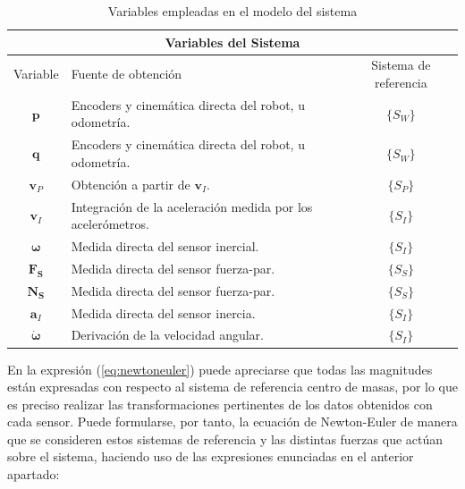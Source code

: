 \begin{table}
\centering
\begin{tabular}[c]{ c p{7.5cm} c }
\hline
\multicolumn{3}{c}{Variables del Sistema} \\
\hline
Variable & Fuente de obtención & Sistema de referencia \\
\hline
$\boldsymbol{p}$ & Encoders y cinemática directa del robot, u odometría\footnotemark[1]. & $\{S_W\}$ \\
$\boldsymbol{q}$ & Encoders y cinemática directa del robot, u odometría\footnotemark[1]. & $\{S_W\}$ \\
$\boldsymbol{v}_P$ & Obtención a partir de $\boldsymbol{v}_I$. & $\{S_P\}$ \\
$\boldsymbol{v}_I$ & Integración de la aceleración medida por los acelerómetros. & $\{S_I\}$ \\
$\boldsymbol{\omega}$ & Medida directa del sensor inercial. & $\{S_I\}$ \\
$\boldsymbol{F_S}$ & Medida directa del sensor fuerza-par. & $\{S_S\}$ \\
$\boldsymbol{N_S}$ & Medida directa del sensor fuerza-par. & $\{S_S\}$ \\
$\boldsymbol{a}_I$ & Medida directa del sensor inercia. & $\{S_I\}$ \\
$\boldsymbol{\dot{\omega}}$ & Derivación de la velocidad angular. & $\{S_I\}$ \\
\hline
\end{tabular}
\caption{Variables empleadas en el modelo del sistema}
\label{tab:fuentevariables}
\end{table}


En la expresión (\ref{eq:newtoneuler}) puede apreciarse que todas las magnitudes están expresadas con respecto al sistema de referencia centro de masas, por lo que es preciso realizar las transformaciones pertinentes de los datos obtenidos con cada sensor. Puede formularse, por tanto, la ecuación de Newton-Euler de manera que se consideren estos sistemas de referencia y las distintas fuerzas que actúan sobre el sistema, haciendo uso de las expresiones enunciadas en el anterior apartado:


